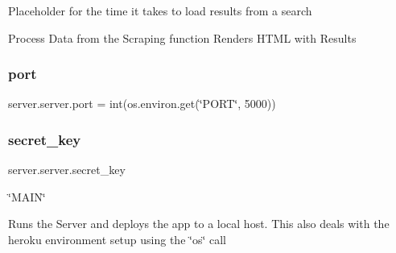 Placeholder for the time it takes to load results from a search

Process Data from the Scraping function Renders H\+T\+ML with Results \mbox{\label{namespaceserver_1_1server_aba3c9bb7c915469f57a050466a1ef6d8}} 
\subsubsection{\texorpdfstring{port}{port}}
{\footnotesize\ttfamily server.\+server.\+port = int(os.\+environ.\+get(\char`\"{}P\+O\+RT\char`\"{}, 5000))}

\mbox{\label{namespaceserver_1_1server_a70d8440bb9056abff06b917ecacce061}} 
\subsubsection{\texorpdfstring{secret\+\_\+key}{secret\_key}}
{\footnotesize\ttfamily server.\+server.\+secret\+\_\+key}



\char`\"{}\+M\+A\+I\+N\char`\"{} 

Runs the Server and deploys the app to a local host. This also deals with the heroku environment setup using the \char`\"{}os\char`\"{} call 